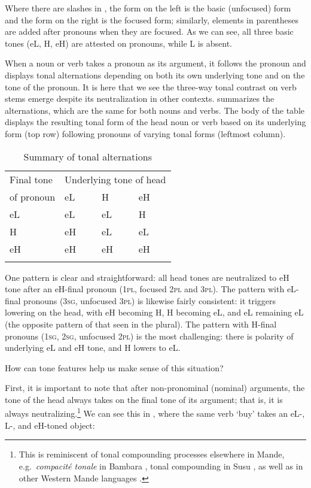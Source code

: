 \documentclass[output=paper]{langsci/langscibook}
\begin{document}
Where there are slashes in , the form on the left is the basic (unfocused) form and the form on the right is the focused form; similarly, elements in parentheses are added after pronouns when they are focused. As we can see, all three basic tones (eL, H, eH) are attested on pronouns, while L is absent.

When a noun or verb takes a pronoun as its argument, it follows the pronoun and displays tonal alternations depending on both its own underlying tone and on the tone of the pronoun. It is here that we see the three-way tonal contrast on verb stems emerge despite its neutralization in other contexts.  summarizes the alternations, which are the same for both nouns and verbs. The body of the table displays the resulting tonal form of the head noun or verb based on its underlying form (top row) following pronouns of varying tonal forms (leftmost column).

\begin{table}
\begin{tabularx}{\textwidth}{X|XXX} 
\lsptoprule
Final tone & \multicolumn{3}{c}{Underlying tone of head} \\
of pronoun & eL & H & eH \\ \midrule
eL & eL & eL & H \\
H & eH & eL & eL \\
eH & eH & eH & eH \\
\lspbottomrule
\end{tabularx}
\caption{Summary of tonal alternations}
\label{tab:mcpherson:3}
\end{table}

One pattern is clear and straightforward: all head tones are neutralized to eH tone after an eH-final pronoun (1\textsc{pl}, focused 2\textsc{pl} and 3\textsc{pl}). The pattern with eL-final pronouns (3\textsc{sg}, unfocused 3\textsc{pl}) is likewise fairly consistent: it triggers lowering on the head, with eH becoming H, H becoming eL, and eL remaining eL (the opposite pattern of that seen in the plural). The pattern with H-final pronouns (1\textsc{sg}, 2\textsc{sg}, unfocused 2\textsc{pl}) is the most challenging: there is polarity of underlying eL and eH tone, and H lowers to eL. 

How can tone features help us make sense of this situation?

First, it is important to note that after non-pronominal (nominal) arguments, the tone of the head always takes on the final tone of its argument; that is, it is always neutralizing.\footnote{This is reminiscent of tonal compounding processes elsewhere in Mande, e.g.\ {\it compacit\'e tonale} in Bambara \citep{Creissels78,Creissels88,Creissels92,Dumestre84,Green10}, tonal compounding in Susu \citep{Gregoire78,Greenetal13}, as well as in other Western Mande languages \citep{deZeeuw79}.} We can see this in , where the same verb {\it {}} `buy' takes an eL-, L-, and eH-toned object:
\end{document}
